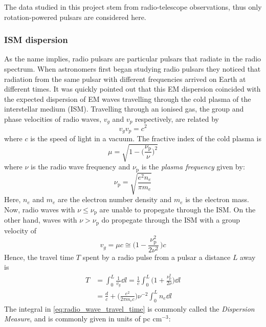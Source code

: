 \documentclass[nofootinbib,reprint,english]{revtex4-1}
\begin{document}
The data studied in this project stem from radio-telescope observations, thus only rotation-powered pulsars are considered here.
\subsubsection{ISM dispersion}
As the name implies, radio pulsars are particular pulsars that radiate in the radio spectrum. When astronomers first began studying radio pulsars they noticed that radiation from the same pulsar with different frequencies arrived on Earth at different times. It was quickly pointed out that this EM dispersion coincided with the expected dispersion of EM waves travelling through the cold plasma of the interstellar medium (ISM). Travelling through an ionised gas, the group and phase velocities of radio waves, \(v_g\) and \(v_p\) respectively, are related by
\begin{equation}\label{eq:group_and_phase_velocities_cold_plasma}
v_gv_p=c^2
\end{equation}
where \(c\) is the speed of light in a vacuum. The fractive index of the cold plasma is
\begin{equation}\label{eq:refractive_index_cold_plasma}
\mu=\sqrt{1-\Big(\frac{\nu_\text{p}}{\nu}\Big)^2}
\end{equation}
where \(\nu\) is the radio wave frequency and \(\nu_\text{p}\) is the \emph{plasma frequency} given by:
\begin{equation}
\nu_\text{p}=\sqrt{\frac{e^2n_e}{\pi m_e}}
\end{equation}
Here, \(n_e\) and \(m_e\) are the electron number density and \(m_e\) is the electron mass. Now, radio waves with \(\nu\leq\nu_\text{p}\) are unable to propegate through the ISM. On the other hand, waves with \(\nu>\nu_\text{p}\) do propegate through the ISM with a group velocity of
\begin{equation}\label{eq:radio_wave_group_velocity_propegation}
v_g=\mu c\cong\bigg(1-\frac{\nu_\text{p}^2}{2\nu^2}\,\bigg)c
\end{equation}
Hence, the travel time \(T\) spent by a radio pulse from a pulsar a distance \(L\) away is
\begin{align}
T&=\int_0^L\frac{1}{v_g}\dd{l}=\frac{1}{c}\int_0^L\bigg(1+\frac{\nu_\text{p}^2}{2\nu}\bigg)\dd{l}\nonumber\\
&=\frac{d}{c}+\bigg(\frac{e^2}{2\pi m_ec}\bigg)\nu^{-2}\int_0^L n_e\dd{l}\label{eq:radio_wave_travel_time}
\end{align}
The integral in \eqref{eq:radio_wave_travel_time} is commonly called the \emph{Dispersion Measure}, and is commonly given in units of pc \(\text{cm}^{-3}\):
\end{document}

